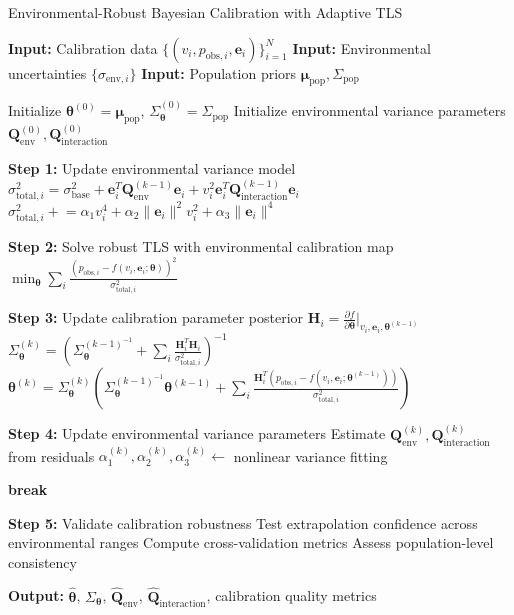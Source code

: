 \documentclass[11pt]{article}
\begin{document}
\begin{algorithm}
\caption{Environmental-Robust Bayesian Calibration with Adaptive TLS}
\begin{algorithmic}[1]
\State \textbf{Input:} Calibration data $\{(v_i, p_{\text{obs},i}, \mathbf{e}_i)\}_{i=1}^N$
\State \textbf{Input:} Environmental uncertainties $\{\sigma_{\text{env},i}\}$
\State \textbf{Input:} Population priors $\bm{\mu}_{\text{pop}}, \Sigma_{\text{pop}}$

\State Initialize $\bm{\theta}^{(0)} = \bm{\mu}_{\text{pop}}$, $\Sigma_{\bm{\theta}}^{(0)} = \Sigma_{\text{pop}}$
\State Initialize environmental variance parameters $\mathbf{Q}_{\text{env}}^{(0)}, \mathbf{Q}_{\text{interaction}}^{(0)}$

    \State \textbf{Step 1:} Update environmental variance model
    \State $\sigma_{\text{total},i}^2 = \sigma_{\text{base}}^2 + \mathbf{e}_i^T \mathbf{Q}_{\text{env}}^{(k-1)} \mathbf{e}_i + v_i^2 \mathbf{e}_i^T \mathbf{Q}_{\text{interaction}}^{(k-1)} \mathbf{e}_i$
    \State $\sigma_{\text{total},i}^2 \mathrel{+}= \alpha_1 v_i^4 + \alpha_2 \|\mathbf{e}_i\|^2 v_i^2 + \alpha_3 \|\mathbf{e}_i\|^4$
    
    \State \textbf{Step 2:} Solve robust TLS with environmental calibration map
    \State $\min_{\bm{\theta}} \sum_i \frac{(p_{\text{obs},i} - f(v_i, \mathbf{e}_i; \bm{\theta}))^2}{\sigma_{\text{total},i}^2}$
    
    \State \textbf{Step 3:} Update calibration parameter posterior
    \State $\mathbf{H}_i = \frac{\partial f}{\partial \bm{\theta}}|_{v_i, \mathbf{e}_i, \bm{\theta}^{(k-1)}}$
    \State $\Sigma_{\bm{\theta}}^{(k)} = \left(\Sigma_{\bm{\theta}}^{(k-1)^{-1}} + \sum_i \frac{\mathbf{H}_i^T \mathbf{H}_i}{\sigma_{\text{total},i}^2}\right)^{-1}$
    \State $\bm{\theta}^{(k)} = \Sigma_{\bm{\theta}}^{(k)} \left(\Sigma_{\bm{\theta}}^{(k-1)^{-1}} \bm{\theta}^{(k-1)} + \sum_i \frac{\mathbf{H}_i^T (p_{\text{obs},i} - f(v_i, \mathbf{e}_i; \bm{\theta}^{(k-1)}))}{\sigma_{\text{total},i}^2}\right)$
    
    \State \textbf{Step 4:} Update environmental variance parameters
    \State Estimate $\mathbf{Q}_{\text{env}}^{(k)}, \mathbf{Q}_{\text{interaction}}^{(k)}$ from residuals
    \State $\alpha_1^{(k)}, \alpha_2^{(k)}, \alpha_3^{(k)} \leftarrow$ nonlinear variance fitting
    
        \State \textbf{break}
    \EndIf
\EndFor

\State \textbf{Step 5:} Validate calibration robustness
\State Test extrapolation confidence across environmental ranges
\State Compute cross-validation metrics
\State Assess population-level consistency

\State \textbf{Output:} $\hat{\bm{\theta}}$, $\Sigma_{\bm{\theta}}$, $\hat{\mathbf{Q}}_{\text{env}}$, $\hat{\mathbf{Q}}_{\text{interaction}}$, calibration quality metrics
\end{algorithmic}
\end{algorithm}
\end{document}
